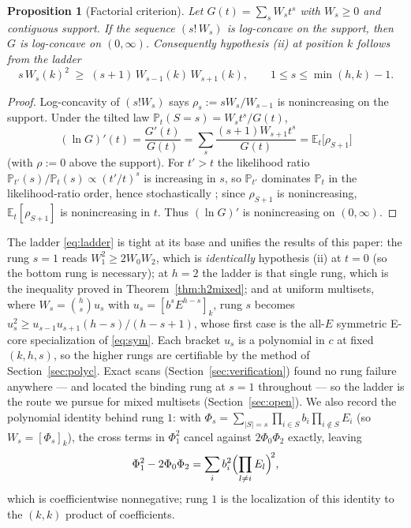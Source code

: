 \documentclass[11pt]{article}
\newtheorem{proposition}[theorem]{Proposition}
\theoremstyle{definition}
\begin{document}
\begin{proposition}[Factorial criterion]\label{prop:ladder}
Let $G(t)=\sum_{s}W_st^s$ with $W_s\ge0$ and contiguous support.  If
the sequence $(s!\,W_s)$ is log-concave on the support, then $G$ is
log-concave on $(0,\infty)$.  Consequently hypothesis (ii) at
position $k$ follows from the \emph{ladder}
\begin{equation}\label{eq:ladder}
  s\,W_s(k)^2\;\ge\;(s+1)\,W_{s-1}(k)\,W_{s+1}(k),
  \qquad 1\le s\le\min(h,k)-1 .
\end{equation}
\end{proposition}

\begin{proof}
Log-concavity of $(s!W_s)$ says $\rho_s:=sW_s/W_{s-1}$ is
nonincreasing on the support.  Under the tilted law
$\mathbb P_t(S=s)=W_st^s/G(t)$,
\[
  (\ln G)'(t)=\frac{G'(t)}{G(t)}
  =\sum_s\frac{(s+1)W_{s+1}t^s}{G(t)}
  =\mathbb E_t\bigl[\rho_{S+1}\bigr]
\]
(with $\rho:=0$ above the support).  For $t'>t$ the likelihood ratio
$\mathbb P_{t'}(s)/\mathbb P_t(s)\propto(t'/t)^s$ is increasing in
$s$, so $\mathbb P_{t'}$ dominates $\mathbb P_t$ in the
likelihood-ratio order, hence stochastically
\cite{ShakedShanthikumar}; since $\rho_{S+1}$ is nonincreasing,
$\mathbb E_t[\rho_{S+1}]$ is nonincreasing in $t$.  Thus $(\ln G)'$
is nonincreasing on $(0,\infty)$.
\end{proof}

The ladder \eqref{eq:ladder} is tight at its base and unifies the
results of this paper:
the rung $s=1$ reads $W_1^2\ge2W_0W_2$, which is \emph{identically}
hypothesis (ii) at $t=0$ (so the bottom rung is necessary); at $h=2$
the ladder is that single rung, which is the inequality proved in
Theorem~\ref{thm:h2mixed}; and at uniform multisets, where
$W_s=\binom hsu_s$ with $u_s=[b^sE^{h-s}]_k$, rung $s$ becomes
$u_s^2\ge u_{s-1}u_{s+1}(h-s)/(h-s+1)$, whose first case is the
all-$E$ symmetric E-core specialization of \eqref{eq:sym}.  Each
bracket $u_s$ is a polynomial in $c$ at fixed $(k,h,s)$, so the higher
rungs are certifiable by the method of Section~\ref{sec:polyc}.  Exact scans
(Section~\ref{sec:verification}) found no rung failure anywhere ---
and located the binding rung at $s=1$ throughout --- so the ladder
is the route we pursue for mixed multisets
(Section~\ref{sec:open}).  We also record the polynomial identity
behind rung $1$: with $\Phi_s=\sum_{|S|=s}\prod_{i\in
S}b_i\prod_{i\notin S}E_i$ (so $W_s=[\Phi_s]_k$), the cross terms in
$\Phi_1^2$ cancel against $2\Phi_0\Phi_2$ exactly, leaving
\[
  \Phi_1^2-2\Phi_0\Phi_2
  =\sum_ib_i^2\Bigl(\prod_{l\ne i}E_l\Bigr)^{\!2},
\]
which is coefficientwise nonnegative; rung $1$ is the localization
of this identity to the $(k,k)$ product of coefficients.
\end{document}
